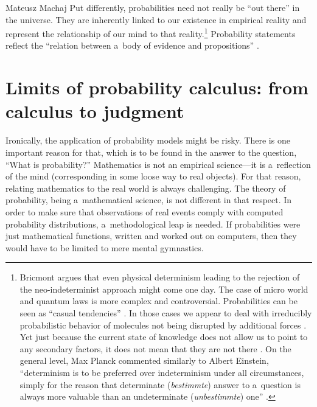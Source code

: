 \begin{artengenv}{Mateusz Machaj}
Put differently, probabilities need not really be ``out there'' in the universe. They are inherently linked to our existence in empirical reality and represent the relationship of our mind to that reality.\footnote{Bricmont 
\parencite*[][]{bricmont_determinism_2002} %
 argues that even physical determinism leading to the rejection of the neo-indeterminist approach might come one day. The case of micro world and quantum laws is more complex and controversial. Probabilities can be seen as ``casual tendencies'' 
\parencite[][p.295]{shanks_time_1993}. %
 In those cases we appear to deal with irreducibly probabilistic behavior of molecules not being disrupted by additional forces 
\parencite[][p.372]{fetzer_probability_1983}. %
 Yet just because the current state of knowledge does not allow us to point to any secondary factors, it does not mean that they are not there 
\parencite[][p.373]{fetzer_probability_1983}. %
 On the general level, Max Planck commented similarly to Albert Einstein, ``determinism is to be preferred over indeterminism under all circumstances, simply for the reason that determinate (\textit{bestimmte}) answer to a~question is always more valuable than an undeterminate (\textit{unbestimmte}) one'' 
\parencite[quoted in][p.281]{kruger_probability_1986}.%
} Probability statements reflect the ``relation between a~body of evidence and propositions'' 
\parencite[][p.232]{moser_foundations_1988}.%




\section{Limits of probability calculus: from calculus to judgment}

Ironically, the application of probability models might be risky. There is one important reason for that, which is to be found in the answer to the question, ``What is probability?'' Mathematics is not an empirical science---it is a~reflection of the mind (corresponding in some loose way to real objects). For that reason, relating mathematics to the real world is always challenging. The theory of probability, being a~mathematical science, is not different in that respect. In order to make sure that observations of real events comply with computed probability distributions, a~methodological leap is needed. If probabilities were just mathematical functions, written and worked out on computers, then they would have to be limited to mere mental gymnastics.




\end{artengenv}
